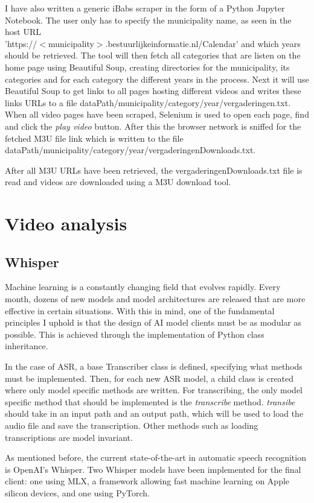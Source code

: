 \documentclass[twoside]{uva-inf-bachelor-thesis}
\begin{document}
I have also written a generic iBabs scraper in the form of a Python Jupyter Notebook. The user only has to specify the municipality name, as seen in the host URL \\ 'https://$<$municipality$>$.bestuurlijkeinformatie.nl/Calendar' and which years should be retrieved. The tool will then fetch all categories that are listen on the home page using Beautiful Soup, creating directories for the municipality, its categories and for each category the different years in the process. 
Next it will use Beautiful Soup to get links to all pages hosting different videos and writes these links URLs to a file dataPath/municipality/category/year/vergaderingen.txt. 
When all video pages have been scraped, Selenium is used to open each page, find and click the \textit{play video} button. After this the browser network is sniffed for the fetched M3U file link which is written to the file dataPath/municipality/category/year/vergaderingenDownloads.txt.

After all M3U URLs have been retrieved, the vergaderingenDownloads.txt file is read and videos are downloaded using a M3U download tool. 


\section{Video analysis}
\subsection{Whisper}
Machine learning is a constantly changing field that evolves rapidly. Every month, dozens of new models and model architectures are released that are more effective in certain situations. 
With this in mind, one of the fundamental principles I uphold is that the design of AI model clients must be as modular as possible. 
This is achieved through the implementation of Python class inheritance. 

In the case of ASR, a base Transcriber class is defined, specifying what methods must be implemented. Then, for each new ASR model, a child class is created where only model specific methods are written. For transcribing, the only model specific method that should be implemented is the \textit{transcribe} method. \textit{transibe} should take in an input path and an output path, which will be used to load the audio file and save the transcription. 
Other methods such as loading transcriptions are model invariant.

As mentioned before, the current state-of-the-art in automatic speech recognition is OpenAI's Whisper. Two Whisper models have been implemented for the final client: one using MLX, a framework allowing fast machine learning on Apple silicon devices, and one using PyTorch. 
\end{document}
